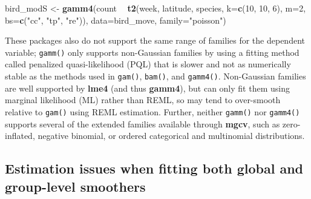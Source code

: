\documentclass[12pt]{article}
\newenvironment{Shaded}{\begin{snugshade}}{\end{snugshade}}
\newcommand{\KeywordTok}[1]{\textcolor[rgb]{0.13,0.29,0.53}{\textbf{#1}}}
\newcommand{\DataTypeTok}[1]{\textcolor[rgb]{0.13,0.29,0.53}{#1}}
\newcommand{\DecValTok}[1]{\textcolor[rgb]{0.00,0.00,0.81}{#1}}
\newcommand{\StringTok}[1]{\textcolor[rgb]{0.31,0.60,0.02}{#1}}
\newcommand{\OperatorTok}[1]{\textcolor[rgb]{0.81,0.36,0.00}{\textbf{#1}}}
\newcommand{\NormalTok}[1]{#1}
\begin{document}
\begin{Shaded}
\begin{Highlighting}[]
\NormalTok{bird_modS <-}\StringTok{ }\KeywordTok{gamm4}\NormalTok{(count }\OperatorTok{~}\StringTok{ }\KeywordTok{t2}\NormalTok{(week, latitude, species, }\DataTypeTok{k=}\KeywordTok{c}\NormalTok{(}\DecValTok{10}\NormalTok{, }\DecValTok{10}\NormalTok{, }\DecValTok{6}\NormalTok{), }\DataTypeTok{m=}\DecValTok{2}\NormalTok{,}
                              \DataTypeTok{bs=}\KeywordTok{c}\NormalTok{(}\StringTok{"cc"}\NormalTok{, }\StringTok{"tp"}\NormalTok{, }\StringTok{"re"}\NormalTok{)),}
                   \DataTypeTok{data=}\NormalTok{bird_move, }\DataTypeTok{family=}\StringTok{"poisson"}\NormalTok{)}
\end{Highlighting}
\end{Shaded}

These packages also do not support the same range of families for the
dependent variable; \texttt{gamm()} only supports non-Gaussian families
by using a fitting method called penalized quasi-likelihood (PQL) that
is slower and not as numerically stable as the methods used in
\texttt{gam()}, \texttt{bam()}, and \texttt{gamm4()}. Non-Gaussian
families are well supported by \textbf{lme4} (and thus \textbf{gamm4}),
but can only fit them using marginal likelihood (ML) rather than REML,
so may tend to over-smooth relative to \texttt{gam()} using REML
estimation. Further, neither \texttt{gamm()} nor \texttt{gamm4()}
supports several of the extended families available through
\textbf{mgcv}, such as zero-inflated, negative binomial, or ordered
categorical and multinomial distributions.

\subsection{Estimation issues when fitting both global and group-level
smoothers}\label{estimation-issues-when-fitting-both-global-and-group-level-smoothers}
\end{document}
